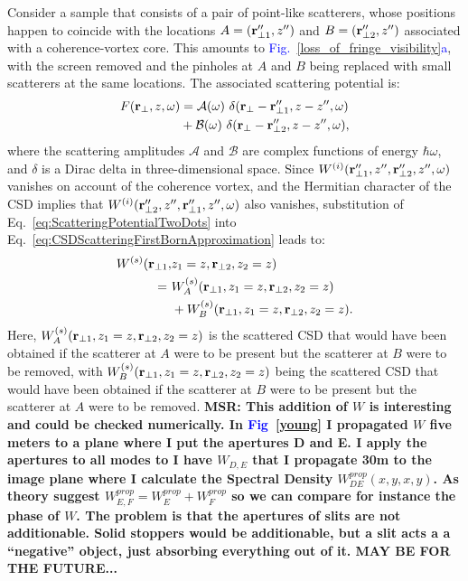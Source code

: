 \documentclass[%
 reprint,
 amsmath,amssymb,
 aps,
]{revtex4-1}
\begin{document}
Consider a sample that consists of a pair of point-like scatterers, whose positions happen to coincide with the locations $A=({\bf r}_{\perp 1}'',z'')$ and $B=({\bf r}_{\perp 2}'',z'')$ associated with a coherence-vortex core. This amounts to \textcolor{blue}{Fig.~\ref{loss_of_fringe_visibility}a}, with the screen removed and the pinholes at $A$ and $B$ being replaced with small scatterers at the same locations.  The associated scattering potential is:
\begin{equation}
\begin{aligned}
F({\bf r}_{\perp},z,\omega) &= \mathcal{A}(\omega)~ \delta({\bf r}_{\perp}-{\bf r}_{\perp 1}'',z-z'',\omega) \\ &+ \mathcal{B}(\omega) ~\delta({\bf r}_{\perp}-{\bf r}_{\perp 2}'',z-z'',\omega),
\label{eq:ScatteringPotentialTwoDots}
\end{aligned}
\end{equation}
where the scattering amplitudes $\mathcal{A}$ and $\mathcal{B}$ are complex functions of energy $\hbar\omega$, and $\delta$ is a Dirac delta in three-dimensional space.   Since $W^{(i)}({\bf r}_{\perp 1}'',z'',{\bf r}_{\perp 2}'',z'',\omega)$ vanishes on account of the coherence vortex, and the Hermitian character of the CSD \cite{mandel_wolf} implies that $W^{(i)}({\bf r}_{\perp 2}'',z'',{\bf r}_{\perp 1}'',z'',\omega)$ also vanishes, substitution of Eq.~\ref{eq:ScatteringPotentialTwoDots} into Eq.~\ref{eq:CSDScatteringFirstBornApproximation} leads to:
\begin{equation}
\begin{aligned}
\label{eq:CSDsforTwoScattersAtCVCore}
W^{(s)} ({\bf r}_{\perp 1}, &z_1=z, {\bf r}_{\perp 2},z_2=z) \\ = ~ &W^{(s)}_A ({\bf r}_{\perp 1}, z_1=z,  {\bf r}_{\perp 2},z_2=z) \\ &+ W^{(s)}_B ({\bf r}_{\perp 1}, z_1=z, {\bf r}_{\perp 2},z_2=z).
\end{aligned}
\end{equation}
Here, $W^{(s)}_A ({\bf r}_{\perp 1}, z_1=z, {\bf r}_{\perp 2},z_2=z)$ is the scattered CSD that would have been obtained if the scatterer at $A$ were to be present but the scatterer at $B$ were to be removed, with $W^{(s)}_B ({\bf r}_{\perp 1}, z_1=z, {\bf r}_{\perp 2},z_2=z)$ being the scattered CSD that would have been obtained if the scatterer at $B$ were to be present but the scatterer at $A$ were to be removed.  
{\bf MSR: This addition of $W$ is interesting and could be checked numerically. In \textcolor{blue}{Fig~\ref{young}} I propagated $W$ five meters to a plane where I put the apertures D and E. I apply the apertures to all modes to I have $W_{D,E}$ that I propagate 30m to the image plane where I calculate the Spectral Density $W_{DE}^{prop}(x,y,x,y)$. As theory suggest $W_{E,F}^{prop}=W_{E}^{prop}+W_{F}^{prop}$ so we can compare for instance the phase of $W$. The problem is that the apertures of slits are not additionable. Solid stoppers would be additionable, but a slit acts a a ``negative'' object, just absorbing everything out of it. MAY BE FOR THE FUTURE...}
\end{document}
